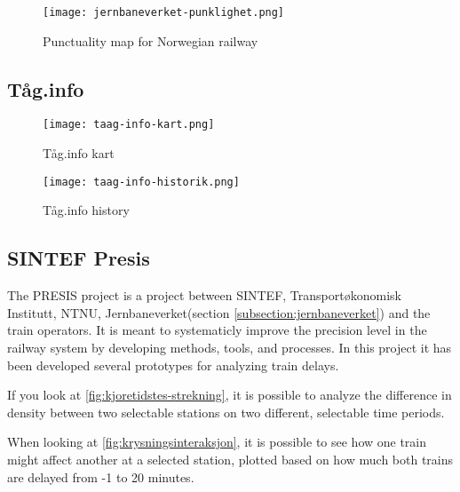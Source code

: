 \begin{figure}[!htbp]
	\texttt{[image: jernbaneverket-punklighet.png]}
	\caption[Punctuality map for Norwegian railway]{Punctuality map for Norwegian railway
	\cite{jernbaneverketPunklighetKart}}
	\label{fig:jernbaneverket-punklighet}
\end{figure}
\pagebreak


\subsection{Tåg.info}
\label{sub:subsection_taag.info}



\begin{figure}[!htbp]
	\texttt{[image: taag-info-kart.png]}
	\caption[Tåg.info kart]{Tåg.info kart
	\cite{taagInfo}}
	\label{fig:taag-info-kart}
\end{figure}
\pagebreak

\begin{figure}[!htbp]
	\texttt{[image: taag-info-historik.png]}
	\caption[Tåg.info history]{Tåg.info history
	\cite{taagInfo}}
	\label{fig:taag-info-kart}
\end{figure}
\pagebreak


\subsection{SINTEF Presis}
\label{sub:subsection_sintefPresis}

The PRESIS\cite{sintefPresis} project is a project between SINTEF\cite{sintef},
Transportøkonomisk Institutt\cite{transportOkonomiskInstitutt},
NTNU\cite{ntnu}, Jernbaneverket(section \vref{subsection:jernbaneverket}) and the train operators. It is meant to
systematicly improve the precision level in the railway system by developing
methods, tools, and processes. In this project it has been developed several
prototypes for analyzing train delays. 

If you look at \vref{fig:kjoretidstes-strekning}, it is possible to analyze the
difference in density between two selectable stations on two different,
selectable time periods. 

When looking at \vref{fig:krysningsinteraksjon}, it is possible to see how one
train might affect another at a selected station, plotted based on how much
both trains are delayed from -1 to 20 minutes. 



